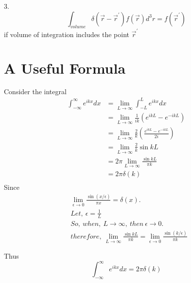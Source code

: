3.$$\int_{volume} \delta (\vec{r} - \vec{r}^\prime) f(\vec{r}) d^3r = f(\vec{r}^\prime)$$ if volume of integration includes the point $\vec{r}^\prime$

\section*{A Useful Formula}
Consider the integral 
\begin{align*}
\int_{-\infty}^{\infty} e^{ikx} dx &= \lim_{L \to \infty} \int_{-L}^{L} e^{ikx}dx \\
&= \lim_{L \to \infty} \frac{1}{ik} \left( e^{ikL} - e^{-ikL} \right) \\
&= \lim_{L \to \infty} \frac{2}{k} \left( \frac{e^{ikL} - e^{-ikL}}{2i} \right) \\
&= \lim_{L \to \infty} \frac{2}{k} \sin kL \\
&= 2\pi \lim_{L \to \infty} \frac{\sin kL}{\pi k} \\
&= 2\pi \delta (k) \\
\end{align*}
Since
\begin{align*}
& \lim_{\epsilon \to 0} \frac{\sin (x/\epsilon)}{\pi x} = \delta (x). \\
& Let, \ \epsilon = \frac{1}{L} \\
& So, \ when, \ L \to \infty, \ then \ \epsilon \to 0. \\
& therefore, \ \lim_{L \to \infty} \frac{\sin kL}{\pi k} = \lim_{\epsilon \to 0} \frac{\sin (k/\epsilon)}{\pi k} 
\end{align*}

Thus
\begin{equation}
\int_{-\infty}^{\infty} e^{ikx} dx = 2\pi \delta (k) 
\end{equation}

